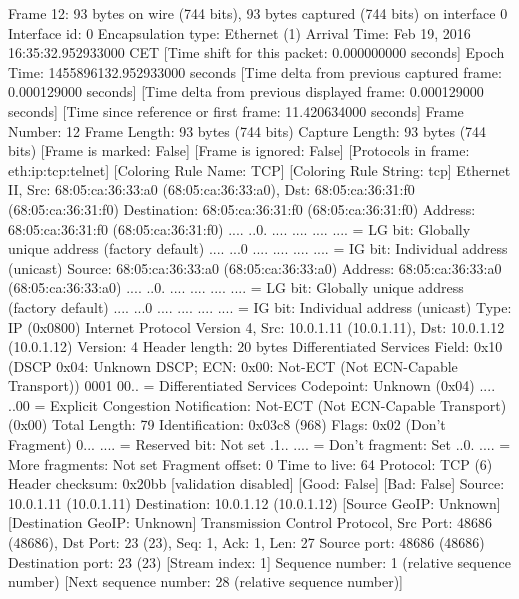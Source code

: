 Frame 12: 93 bytes on wire (744 bits), 93 bytes captured (744 bits) on interface 0
    Interface id: 0
    Encapsulation type: Ethernet (1)
    Arrival Time: Feb 19, 2016 16:35:32.952933000 CET
    [Time shift for this packet: 0.000000000 seconds]
    Epoch Time: 1455896132.952933000 seconds
    [Time delta from previous captured frame: 0.000129000 seconds]
    [Time delta from previous displayed frame: 0.000129000 seconds]
    [Time since reference or first frame: 11.420634000 seconds]
    Frame Number: 12
    Frame Length: 93 bytes (744 bits)
    Capture Length: 93 bytes (744 bits)
    [Frame is marked: False]
    [Frame is ignored: False]
    [Protocols in frame: eth:ip:tcp:telnet]
    [Coloring Rule Name: TCP]
    [Coloring Rule String: tcp]
Ethernet II, Src: 68:05:ca:36:33:a0 (68:05:ca:36:33:a0), Dst: 68:05:ca:36:31:f0 (68:05:ca:36:31:f0)
    Destination: 68:05:ca:36:31:f0 (68:05:ca:36:31:f0)
        Address: 68:05:ca:36:31:f0 (68:05:ca:36:31:f0)
        .... ..0. .... .... .... .... = LG bit: Globally unique address (factory default)
        .... ...0 .... .... .... .... = IG bit: Individual address (unicast)
    Source: 68:05:ca:36:33:a0 (68:05:ca:36:33:a0)
        Address: 68:05:ca:36:33:a0 (68:05:ca:36:33:a0)
        .... ..0. .... .... .... .... = LG bit: Globally unique address (factory default)
        .... ...0 .... .... .... .... = IG bit: Individual address (unicast)
    Type: IP (0x0800)
Internet Protocol Version 4, Src: 10.0.1.11 (10.0.1.11), Dst: 10.0.1.12 (10.0.1.12)
    Version: 4
    Header length: 20 bytes
    Differentiated Services Field: 0x10 (DSCP 0x04: Unknown DSCP; ECN: 0x00: Not-ECT (Not ECN-Capable Transport))
        0001 00.. = Differentiated Services Codepoint: Unknown (0x04)
        .... ..00 = Explicit Congestion Notification: Not-ECT (Not ECN-Capable Transport) (0x00)
    Total Length: 79
    Identification: 0x03c8 (968)
    Flags: 0x02 (Don't Fragment)
        0... .... = Reserved bit: Not set
        .1.. .... = Don't fragment: Set
        ..0. .... = More fragments: Not set
    Fragment offset: 0
    Time to live: 64
    Protocol: TCP (6)
    Header checksum: 0x20bb [validation disabled]
        [Good: False]
        [Bad: False]
    Source: 10.0.1.11 (10.0.1.11)
    Destination: 10.0.1.12 (10.0.1.12)
    [Source GeoIP: Unknown]
    [Destination GeoIP: Unknown]
Transmission Control Protocol, Src Port: 48686 (48686), Dst Port: 23 (23), Seq: 1, Ack: 1, Len: 27
    Source port: 48686 (48686)
    Destination port: 23 (23)
    [Stream index: 1]
    Sequence number: 1    (relative sequence number)
    [Next sequence number: 28    (relative sequence number)]
